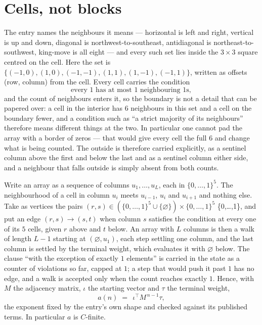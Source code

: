 \documentclass[11pt,a4paper]{article}
\theoremstyle{plain}
\theoremstyle{definition}
\begin{document}
\section{Cells, not blocks}

The entry names the neighbours it means --- horizontal is left and right, vertical is up and
down, diagonal is northwest-to-southeast, antidiagonal is northeast-to-southwest, king-move is
all eight --- and every such set lies inside the $3\times3$ square centred on the cell. Here
the set is $\{(-1,0), (1,0), (-1,-1), (1,1), (1,-1), (-1,1)\}$, written as offsets (row, column) from the cell. Every cell carries
the condition
\[
\text{every 1 has at most 1 neighbouring 1s},
\]
and the count of neighbours enters it, so the boundary is not a detail that can be papered
over: a cell in the interior has $6$ neighbours in this set and a cell on the boundary
fewer, and a condition such as ``a strict majority of its neighbours'' therefore means
different things at the two. In particular one cannot pad the array with a border of zeros ---
that would give every cell the full $6$ and change what is being counted. The outside is
therefore carried
explicitly, as a sentinel column above the first and below the last and as a sentinel column
either side, and a neighbour that falls outside is simply absent from both counts.

Write an array as a sequence of columns $u_1,\dots,u_L$, each in
$\{0,\dots,1\}^{5}$. The neighbourhood of a cell in column $u_i$ meets $u_{i-1}$,
$u_i$ and $u_{i+1}$ and nothing else. Take as vertices the pairs
$(r,s)\in(\{0,\dots,1\}^{5}\cup\{\varnothing\})\times\{0,\dots,1\}^{5}$ \times \{0,\dots,1\},
and put an edge $(r,s)\to(s,t)$ when column $s$ satisfies the condition at every one of its
$5$ cells, given $r$ above and $t$ below. An array with $L$ columns is then a walk of length
$L-1$ starting at $(\varnothing,u_1)$, each step settling one column, and the last column is
settled by the terminal weight, which evaluates it with $\varnothing$ below. The clause ``with the exception of exactly $1$ elements'' is carried in
the state as a counter of violations so far, capped at $1$; a step that would push it past
$1$ has no edge, and a walk is accepted only when the count reaches exactly $1$. Hence,
with $M$ the adjacency matrix, $\iota$ the starting vector and $\tau$ the terminal weight,
\[
a(n)\;=\;\,\iota^{\!\top}M^{\,n-1}\tau ,
\]
the exponent fixed by the entry's own shape and checked against its published terms. In
particular $a$ is $C$-finite.
\end{document}
